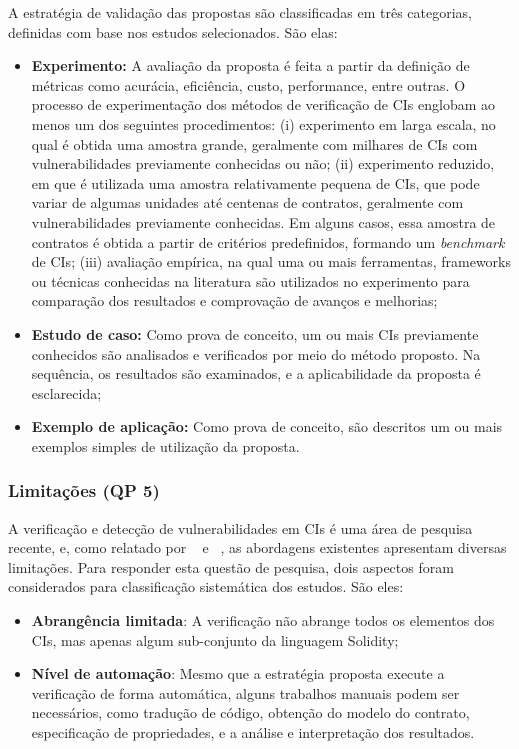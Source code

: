 A estratégia de validação das propostas são classificadas em três categorias, definidas com base nos estudos selecionados. São elas:
\begin{itemize}
    \item \textbf{Experimento:} A avaliação da proposta é feita a partir da definição de métricas como acurácia, eficiência, custo, performance, entre outras. O processo de experimentação dos métodos de verificação de CIs englobam ao menos um dos seguintes procedimentos: (i) experimento em larga escala, no qual é obtida uma amostra grande, geralmente com milhares de CIs com vulnerabilidades previamente conhecidas ou não; (ii) experimento reduzido, em que é utilizada uma amostra relativamente pequena de CIs, que pode variar de algumas unidades até centenas de contratos, geralmente com vulnerabilidades previamente conhecidas. Em alguns casos, essa amostra de contratos é obtida a partir de critérios predefinidos, formando um \textit{benchmark} de CIs; (iii) avaliação empírica, na qual uma ou mais ferramentas, frameworks ou técnicas conhecidas na literatura são utilizados no experimento para comparação dos resultados e comprovação de avanços e melhorias;
    \item \textbf{Estudo de caso:} Como prova de conceito, um ou mais CIs previamente conhecidos são analisados e verificados por meio do método proposto. Na sequência, os resultados são examinados, e a aplicabilidade da proposta é esclarecida;  
    \item \textbf{Exemplo de aplicação:} Como prova de conceito, são descritos um ou mais exemplos simples de utilização da proposta.  
\end{itemize}

\subsubsection*{\textbf{Limitações (QP 5)}}

A verificação e detecção de vulnerabilidades em CIs é uma área de pesquisa recente, e, como relatado por ~ e ~, as abordagens existentes apresentam diversas limitações. Para responder esta questão de pesquisa, dois aspectos foram considerados para classificação sistemática dos estudos. São eles:

\begin{itemize}
    \item \textbf{Abrangência limitada}: A verificação não abrange todos os elementos dos CIs, mas apenas algum sub-conjunto da linguagem Solidity;
    \item \textbf{Nível de automação}: Mesmo que a estratégia proposta execute a verificação de forma automática, alguns trabalhos manuais podem ser necessários, como tradução de código, obtenção do modelo do contrato, especificação de propriedades, e a análise e interpretação dos resultados.
\end{itemize}

